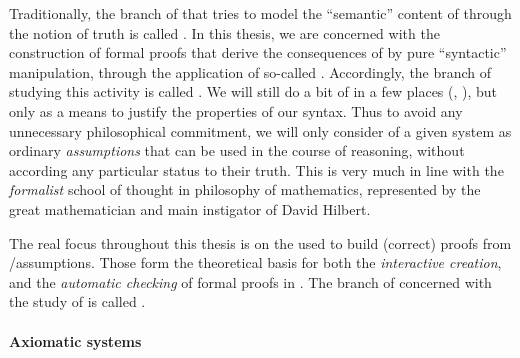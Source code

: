 Traditionally, the branch of  that tries to model the
``semantic'' content of  through the notion of truth is called
. In this thesis, we are concerned with the construction of
formal proofs that derive the consequences of  by pure ``syntactic''
manipulation, through the application of so-called .
Accordingly, the branch of  studying this activity is
called . We will still do a bit of  in a few
places (, ), but only as a means
to justify the properties of our syntax. Thus to avoid any unnecessary
philosophical commitment, we will only consider  of a given system as
ordinary \emph{assumptions} that can be used in the course of reasoning, without
according any particular status to their truth. This is very much in line with
the \emph{formalist} school of thought in philosophy of mathematics, represented
by the great mathematician and main instigator of  David Hilbert.

\begin{emphpar}
The real focus throughout this thesis is on the \emph{} used to
build (correct) proofs from /assumptions. Those form the theoretical basis
for both the \emph{interactive creation}, and the \emph{automatic checking} of
formal proofs in . The branch of  concerned with the
study of  is called .
\end{emphpar}

\paragraph{Axiomatic systems} 

